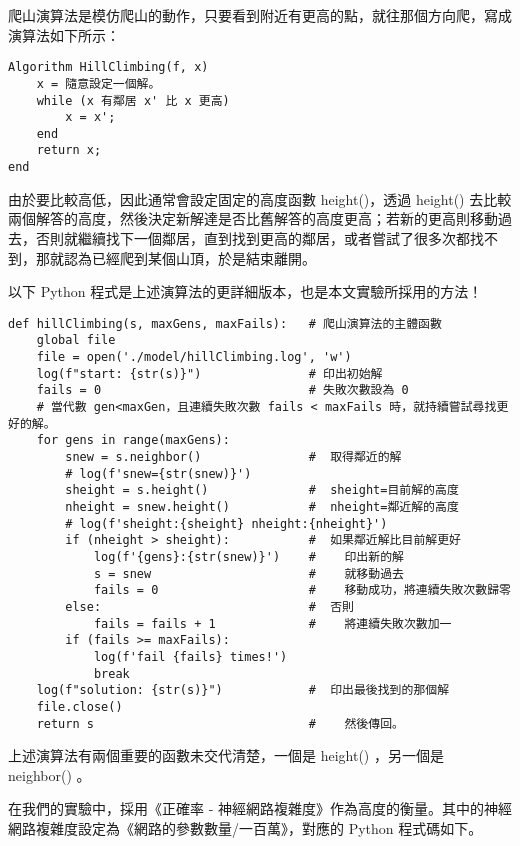 \documentclass{article}
\begin{document}
爬山演算法是模仿爬山的動作，只要看到附近有更高的點，就往那個方向爬，寫成演算法如下所示：

\begin{minipage}{\linewidth}
\begin{verbatim}
Algorithm HillClimbing(f, x)
    x = 隨意設定一個解。
    while (x 有鄰居 x' 比 x 更高)
        x = x';
    end
    return x;
end
\end{verbatim}
\end{minipage}

由於要比較高低，因此通常會設定固定的高度函數 height()，透過 height() 去比較兩個解答的高度，然後決定新解達是否比舊解答的高度更高；若新的更高則移動過去，否則就繼續找下一個鄰居，直到找到更高的鄰居，或者嘗試了很多次都找不到，那就認為已經爬到某個山頂，於是結束離開。

以下 Python 程式是上述演算法的更詳細版本，也是本文實驗所採用的方法！

\begin{minipage}{\linewidth}
\begin{lstlisting}
def hillClimbing(s, maxGens, maxFails):   # 爬山演算法的主體函數
    global file
    file = open('./model/hillClimbing.log', 'w')
    log(f"start: {str(s)}")               # 印出初始解
    fails = 0                             # 失敗次數設為 0
    # 當代數 gen<maxGen，且連續失敗次數 fails < maxFails 時，就持續嘗試尋找更好的解。
    for gens in range(maxGens):
        snew = s.neighbor()               #  取得鄰近的解
        # log(f'snew={str(snew)}')
        sheight = s.height()              #  sheight=目前解的高度
        nheight = snew.height()           #  nheight=鄰近解的高度
        # log(f'sheight:{sheight} nheight:{nheight}')
        if (nheight > sheight):           #  如果鄰近解比目前解更好
            log(f'{gens}:{str(snew)}')    #    印出新的解
            s = snew                      #    就移動過去
            fails = 0                     #    移動成功，將連續失敗次數歸零
        else:                             #  否則
            fails = fails + 1             #    將連續失敗次數加一
        if (fails >= maxFails):
            log(f'fail {fails} times!')
            break
    log(f"solution: {str(s)}")            #  印出最後找到的那個解
    file.close()
    return s                              #    然後傳回。
\end{lstlisting}
\end{minipage}

上述演算法有兩個重要的函數未交代清楚，一個是 height() ，另一個是 neighbor() 。

在我們的實驗中，採用《正確率 - 神經網路複雜度》作為高度的衡量。其中的神經網路複雜度設定為《網路的參數數量/一百萬》，對應的 Python 程式碼如下。
\end{document}
